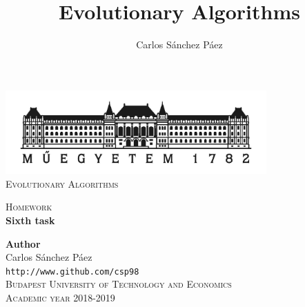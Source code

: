 \documentclass[12pt,english]{article}
\title{Evolutionary Algorithms}
\author{Carlos Sánchez Páez}
\begin{document}
\begin{titlepage}

\newlength{\centeroffset}
\setlength{\centeroffset}{-0.5\oddsidemargin}
\addtolength{\centeroffset}{0.5\evensidemargin}
\thispagestyle{empty}

\noindent\hspace*{\centeroffset}
\begin{minipage}{\textwidth}

\centering
\includegraphics[width=0.75\textwidth]{bme_logo.jpg}\\[1.4cm]

\textsc{ \Large Evolutionary Algorithms\\[4cm]}

\textsc{\Huge Homework}\\[0.75cm]

{\Large\bfseries Sixth task\\}
\end{minipage}

\vspace{8cm}
\noindent\hspace*{\centeroffset}
\begin{minipage}{\textwidth}
\centering

\textbf{Author}\\ {Carlos Sánchez Páez}\\
\texttt{http://www.github.com/csp98}\\[0.5cm]
\textsc{Budapest University of Technology and Economics}\\
\vspace{1cm}
\textsc{Academic year 2018-2019}
\end{minipage}
\end{titlepage}
\thispagestyle{empty}

\newpage
\end{document}
